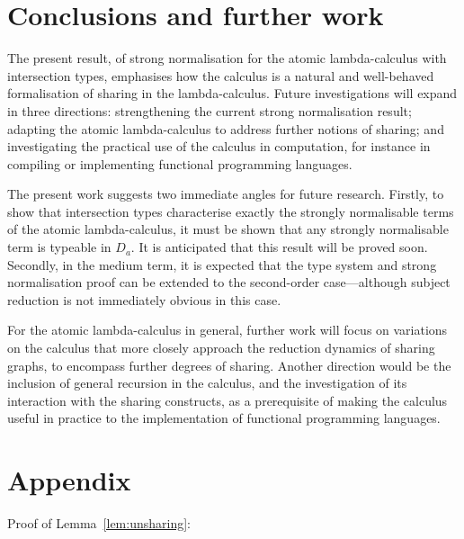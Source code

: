 \documentclass[orivec]{llncs}
\begin{document}
\section{Conclusions and further work}



The present result, of strong normalisation for the atomic lambda-calculus with intersection types, emphasises how the calculus is a natural and well-behaved formalisation of sharing in the lambda-calculus.
%
Future investigations will expand in three directions: strengthening the current strong normalisation result; adapting the atomic lambda-calculus to address further notions of sharing; and investigating the practical use of the calculus in computation, for instance in compiling or implementing functional programming languages.



The present work suggests two immediate angles for future research.
%
Firstly, to show that intersection types characterise exactly the strongly normalisable terms of the atomic lambda-calculus, it must be shown that any strongly normalisable term is typeable in $D_a$.
%
It is anticipated that this result will be proved soon.
%
Secondly, in the medium term, it is expected that the type system and strong normalisation proof can be extended to the second-order case---although subject reduction is not immediately obvious in this case.


For the atomic lambda-calculus in general, further work will focus on variations on the calculus that more closely approach the reduction dynamics of sharing graphs, to encompass further degrees of sharing.
%
Another direction would be the inclusion of general recursion in the calculus, and the investigation of its interaction with the sharing constructs, as a prerequisite of making the calculus useful in practice to the implementation of functional programming languages.






\newpage

\section*{Appendix}



Proof of Lemma~\ref{lem:unsharing}:
\end{document}
